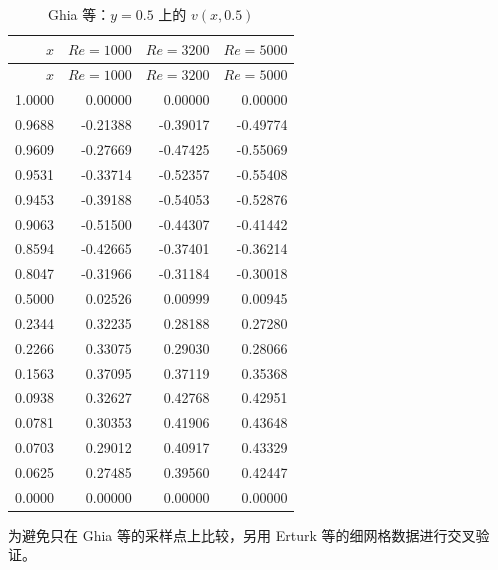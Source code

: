 \documentclass[UTF8,a4paper,11pt]{ctexart}
\begin{document}
\begin{longtable}{r|rrr}
\caption{Ghia 等\cite{Ghia1982}：\(y=0.5\) 上的 \(v(x,0.5)\)}
\label{tab:ghia-v}\\
\toprule
\(x\) & \(Re=1000\) & \(Re=3200\) & \(Re=5000\) \\
\midrule
\endfirsthead
\toprule
\(x\) & \(Re=1000\) & \(Re=3200\) & \(Re=5000\) \\
\midrule
\endhead
1.0000 & 0.00000 & 0.00000 & 0.00000 \\
0.9688 & -0.21388 & -0.39017 & -0.49774 \\
0.9609 & -0.27669 & -0.47425 & -0.55069 \\
0.9531 & -0.33714 & -0.52357 & -0.55408 \\
0.9453 & -0.39188 & -0.54053 & -0.52876 \\
0.9063 & -0.51500 & -0.44307 & -0.41442 \\
0.8594 & -0.42665 & -0.37401 & -0.36214 \\
0.8047 & -0.31966 & -0.31184 & -0.30018 \\
0.5000 & 0.02526 & 0.00999 & 0.00945 \\
0.2344 & 0.32235 & 0.28188 & 0.27280 \\
0.2266 & 0.33075 & 0.29030 & 0.28066 \\
0.1563 & 0.37095 & 0.37119 & 0.35368 \\
0.0938 & 0.32627 & 0.42768 & 0.42951 \\
0.0781 & 0.30353 & 0.41906 & 0.43648 \\
0.0703 & 0.29012 & 0.40917 & 0.43329 \\
0.0625 & 0.27485 & 0.39560 & 0.42447 \\
0.0000 & 0.00000 & 0.00000 & 0.00000 \\
\bottomrule
\end{longtable}

为避免只在 Ghia 等\cite{Ghia1982}的采样点上比较，另用 Erturk 等\cite{Erturk2005}的细网格数据进行交叉验证。
\end{document}
